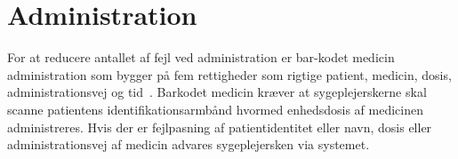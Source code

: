 \section{Administration}
For at reducere antallet af fejl ved administration er bar-kodet medicin administration som bygger på fem rettigheder som rigtige patient, medicin, dosis, administrationsvej og tid~\citep{Agrawal2009}. 
Barkodet medicin kræver at sygeplejerskerne  skal scanne patientens identifikationsarmbånd hvormed enhedsdosis af medicinen administreres. Hvis der er fejlpasning af patientidentitet eller navn, dosis eller administrationsvej af medicin advares sygeplejersken via systemet.~\citep{Agrawal2009}




